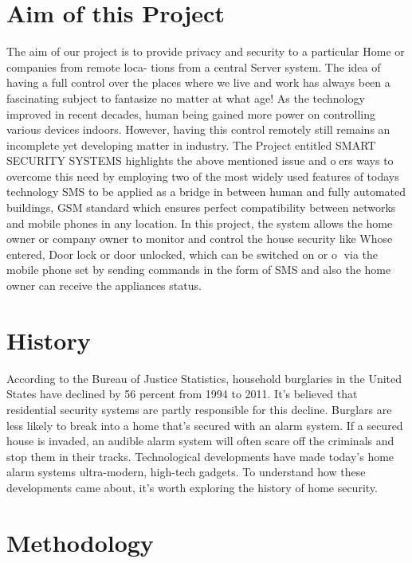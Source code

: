 \documentclass[twoside,a4paper,16pt]{book}
\begin{document}
{{			\section{Aim of this Project}
			The aim of our project is to provide privacy and security to a particular Home or companies from remote loca-
			tions from a central Server system. The idea of having a full control over the places where we live and work has always
			been a fascinating subject to fantasize no matter at what age! As the technology improved in recent decades, human
			being gained more power on controlling various devices indoors. However, having this control remotely still remains
			an incomplete yet developing matter in industry.
			The Project entitled SMART SECURITY SYSTEMS highlights the above mentioned issue and oers ways to
			overcome this need by employing two of the most widely used features of todays technology SMS to be applied as a
			bridge in between human and fully automated buildings, GSM standard which ensures perfect compatibility between
			networks and mobile phones in any location.
			In this project, the system allows the home owner or company owner to monitor and control the house security like
			Whose entered, Door lock or door unlocked, which can be switched on or o via the mobile phone set by sending
			commands in the form of SMS and also the home owner can receive the appliances status.
			\section{History}
			According to the Bureau of Justice Statistics, household burglaries in the United States have declined by 56 percent from 1994 to 2011. It's believed that residential security systems are partly responsible for this decline. Burglars are less likely to break into a home that's secured with an alarm system. If a secured house is invaded, an audible alarm system will often scare off the criminals and stop them in their tracks. Technological developments have made today's home alarm systems ultra-modern, high-tech gadgets. To understand how these developments came about, it's worth exploring the history of home security.\\
			
			\section{ Methodology}
			
}}
\end{document}
